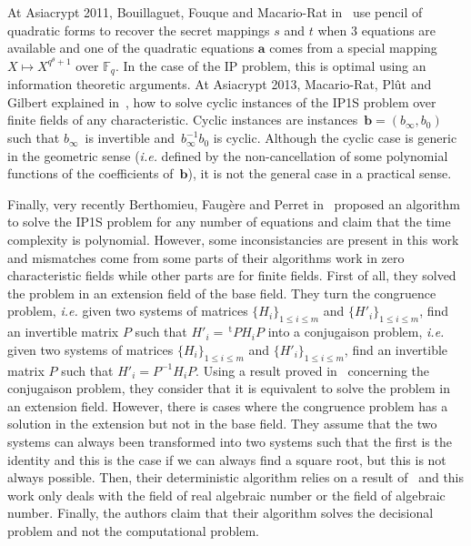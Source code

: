 \documentclass{lms}%
\def\transpose{\,{}^{\mathrm{t}\!}}
\def\F{\mathbb{F}}
\def\commentaire#1{{\bfseries\textcolor{red}{#1}}}
\begin{document}
At Asiacrypt 2011, Bouillaguet, Fouque and Macario-Rat in~\cite{DBLP:conf/asiacrypt/BouillaguetFM11} 
use pencil of quadratic forms to recover the secret mappings $s$ and $t$ when $3$ equations are available
and one of the quadratic equations $\bm{a}$ comes from a special mapping $X\mapsto X^{q^\theta+1}$ 
over $\F_q$. In the case of the IP problem, this is optimal using an information theoretic arguments. 
At Asiacrypt 2013, Macario-Rat, Plût and Gilbert explained in~\cite{MPG2013}, how to
solve cyclic instances of the IP1S problem over finite fields of any characteristic. Cyclic instances are 
instances~$\bm{b} = (b_{∞}, b_{0})$ such that $b_{∞}$~is invertible and~$b_{∞}^{-1} b_{0}$ is cyclic.
Although the cyclic case is generic in the geometric sense (\emph{i.e.}
defined by the non-cancellation of some polynomial functions of the
coefficients of~$\bm{b}$), it is not the general case in a practical
sense.

Finally, very recently Berthomieu, Faugère and Perret in~\cite{DBLP:journals/corr/BerthomieuFP13}
proposed an algorithm to solve the IP1S problem for any number of equations and claim that the 
time complexity is polynomial. However, some inconsistancies are present in this work and mismatches 
come from some parts of their algorithms work in zero characteristic fields while other parts are for 
finite fields. First of all, 
they solved the problem in an extension field of the base field. They turn the congruence problem, 
\textit{i.e.} given two systems of matrices $\{H_i\}_{1\leq i \leq m}$ and $\{H'_i\}_{1\leq i \leq m}$, 
find an invertible matrix $P$ such that $H'_i=\transpose{P}H_iP$ into a conjugaison problem, 
\textit{i.e.} given two systems of matrices $\{H_i\}_{1\leq i \leq m}$ and $\{H'_i\}_{1\leq i \leq m}$, 
find an invertible matrix $P$ such that $H'_i=P^{-1}H_iP$. Using a result proved in~\cite{dSP10} concerning 
the conjugaison problem, they
consider that it is equivalent to solve the problem in an extension field. However, there is cases where
the congruence problem has a solution in the extension but not in the base field. They assume that 
the two systems can always been transformed into two systems such that the first is the identity and 
this is the case if we can always find a square root, but this is not always possible. Then, their deterministic
algorithm relies on a result of~\cite{DBLP:conf/issac/ChistovIK97} and this work only deals with 
the field of real algebraic number or the field of algebraic number. Finally, the authors claim that their 
algorithm solves the decisional problem and not the computational problem.  
\end{document}

